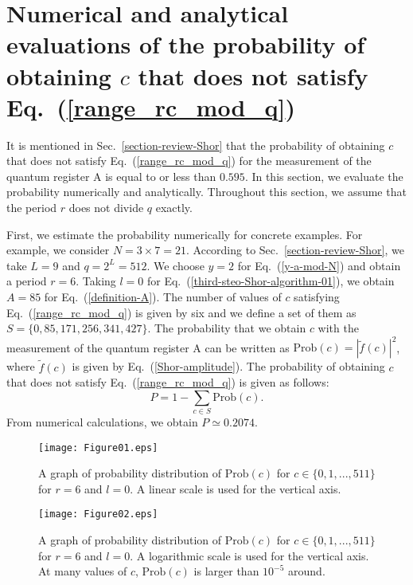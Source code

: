 \documentclass[12pt]{article}
\begin{document}
\section{\label{numerical-calculations}Numerical and analytical evaluations of the probability of obtaining $c$ that does not satisfy Eq.~(\ref{range_rc_mod_q})}
It is mentioned in Sec.~\ref{section-review-Shor} that the probability of obtaining $c$ that does not satisfy Eq.~(\ref{range_rc_mod_q})
for the measurement of the quantum register A is equal to or less than $0.595$.
In this section,
we evaluate the probability numerically and analytically.
Throughout this section,
we assume that the period $r$ does not divide $q$ exactly.

First, we estimate the probability numerically for concrete examples.
For example,
we consider $N=3\times 7=21$.
According to Sec.~\ref{section-review-Shor},
we take $L=9$ and $q=2^{L}=512$.
We choose $y=2$ for Eq.~(\ref{y-a-mod-N})
and obtain a period $r=6$.
Taking $l=0$ for Eq.~(\ref{third-steo-Shor-algorithm-01}),
we obtain $A=85$ for Eq.~(\ref{definition-A}).
The number of values of $c$ satisfying Eq.~(\ref{range_rc_mod_q}) is given by six and we define a set of them as
$S=\{0,85,171,256,341,427\}$.
The probability that we obtain $c$ with the measurement of the quantum register A can be written as $\mbox{Prob}(c)=|\tilde{f}(c)|^{2}$,
where $\tilde{f}(c)$ is given by Eq.~(\ref{Shor-amplitude}).
The probability of obtaining $c$ that does not satisfy Eq.~(\ref{range_rc_mod_q}) is given as follows:
\begin{equation}
P
=
1-\sum_{c\in S}\mbox{Prob}(c).
\label{Probability_exclude}
\end{equation}
From numerical calculations,
we obtain $P\simeq 0.2074$.

\begin{figure}
\begin{center}
\texttt{[image: Figure01.eps]}
\end{center}
\caption{A graph of probability distribution of $\mbox{Prob}(c)$ for $c\in\{0,1,...,511\}$
for $r=6$ and $l=0$.
A linear scale is used for the vertical axis.}
\label{Figure01}
\end{figure}

\begin{figure}
\begin{center}
\texttt{[image: Figure02.eps]}
\end{center}
\caption{A graph of probability distribution of $\mbox{Prob}(c)$ for $c\in\{0,1,...,511\}$
for $r=6$ and $l=0$.
A logarithmic scale is used for the vertical axis.
At many values of $c$,
$\mbox{Prob}(c)$ is larger than $10^{-5}$ around.}
\label{Figure02}
\end{figure}
\end{document}
